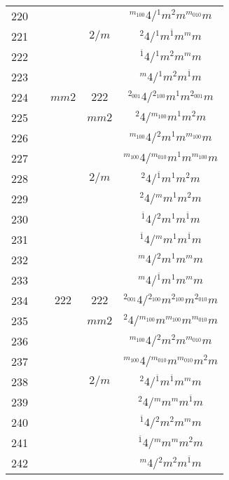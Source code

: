 \begin{longtable}{ccccc}
  220 &  &  &  & ${}^{m_{100}} 4  / {}^{1} m {}^{2} m {}^{m_{010}} m $\\
  221 &  &  & $2/m$ & ${}^{2} 4  / {}^{1} m {}^{\overline{1}} m {}^{m} m $\\
  222 &  &  &  & ${}^{\overline{1}} 4  / {}^{1} m {}^{2} m {}^{m} m $\\
  223 &  &  &  & ${}^{m} 4  / {}^{1} m {}^{2} m {}^{\overline{1}} m $\\
  224 &  & $mm2$ & $222$ & ${}^{2_{001}} 4  / {}^{2_{100}} m {}^{1} m {}^{2_{001}} m $\\
  225 &  &  & $mm2$ & ${}^{2} 4  / {}^{m_{100}} m {}^{1} m {}^{2} m $\\
  226 &  &  &  & ${}^{m_{100}} 4  / {}^{2} m {}^{1} m {}^{m_{100}} m $\\
  227 &  &  &  & ${}^{m_{100}} 4  / {}^{m_{010}} m {}^{1} m {}^{m_{100}} m $\\
  228 &  &  & $2/m$ & ${}^{2} 4  / {}^{\overline{1}} m {}^{1} m {}^{2} m $\\
  229 &  &  &  & ${}^{2} 4  / {}^{m} m {}^{1} m {}^{2} m $\\
  230 &  &  &  & ${}^{\overline{1}} 4  / {}^{2} m {}^{1} m {}^{\overline{1}} m $\\
  231 &  &  &  & ${}^{\overline{1}} 4  / {}^{m} m {}^{1} m {}^{\overline{1}} m $\\
  232 &  &  &  & ${}^{m} 4  / {}^{2} m {}^{1} m {}^{m} m $\\
  233 &  &  &  & ${}^{m} 4  / {}^{\overline{1}} m {}^{1} m {}^{m} m $\\
  234 &  & $222$ & $222$ & ${}^{2_{001}} 4  / {}^{2_{100}} m {}^{2_{100}} m {}^{2_{010}} m $\\
  235 &  &  & $mm2$ & ${}^{2} 4  / {}^{m_{100}} m {}^{m_{100}} m {}^{m_{010}} m $\\
  236 &  &  &  & ${}^{m_{100}} 4  / {}^{2} m {}^{2} m {}^{m_{010}} m $\\
  237 &  &  &  & ${}^{m_{100}} 4  / {}^{m_{010}} m {}^{m_{010}} m {}^{2} m $\\
  238 &  &  & $2/m$ & ${}^{2} 4  / {}^{\overline{1}} m {}^{\overline{1}} m {}^{m} m $\\
  239 &  &  &  & ${}^{2} 4  / {}^{m} m {}^{m} m {}^{\overline{1}} m $\\
  240 &  &  &  & ${}^{\overline{1}} 4  / {}^{2} m {}^{2} m {}^{m} m $\\
  241 &  &  &  & ${}^{\overline{1}} 4  / {}^{m} m {}^{m} m {}^{2} m $\\
  242 &  &  &  & ${}^{m} 4  / {}^{2} m {}^{2} m {}^{\overline{1}} m $\\

\end{longtable}
